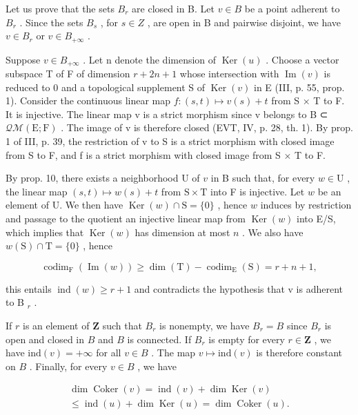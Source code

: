 Let us prove that the sets \(B_{r}\) are closed in B. Let \(v \in B\) be a point adherent to \(B_{r}\) . Since the sets \(B_{s}\) , for \(s \in Z\) , are open in B and pairwise disjoint, we have \(v \in B_{r}\) or \(v \in B_{+\infty}\) .

Suppose \(v \in B_{+\infty}\) . Let n denote the dimension of \(\operatorname{Ker}(u)\) . Choose a vector subspace T of F of dimension \(r + 2n + 1\) whose intersection with \(\operatorname{Im}(v)\) is reduced to 0 and a topological supplement S of \(\operatorname{Ker}(v)\) in E (III, p. 55, prop. 1). Consider the continuous linear map \(f: (s, t) \mapsto v(s) + t\) from S × T to F. It is injective. The linear map v is a strict morphism since v belongs to B ⊂ \(\mathcal{Q}\mathcal{M}(\mathrm{E};\mathrm{F})\) . The image of v is therefore closed (EVT, IV, p. 28, th. 1). By prop. 1 of III, p. 39, the restriction of v to S is a strict morphism with closed image from S to F, and f is a strict morphism with closed image from S × T to F.

By prop. 10, there exists a neighborhood U of \(v\) in B such that, for every \(w \in \mathrm{U}\) , the linear map \((s,t) \mapsto w(s) + t\) from \(\mathrm{S} \times \mathrm{T}\) into F is injective. Let \(w\) be an element of U. We then have \(\operatorname{Ker}(w) \cap \mathrm{S} = \{0\}\) , hence \(w\) induces by restriction and passage to the quotient an injective linear map from \(\operatorname{Ker}(w)\) into E/S, which implies that \(\operatorname{Ker}(w)\) has dimension at most \(n\) . We also have \(w(\mathrm{S}) \cap \mathrm{T} = \{0\}\) , hence

\[
\operatorname{codim} _ {\mathrm{F}} (\operatorname{Im} (w)) \geqslant \dim (\mathrm{T}) - \operatorname{codim} _ {\mathrm{E}} (\mathrm{S}) = r + n + 1,
\]

this entails \(\operatorname{ind}(w) \geqslant r + 1\) and contradicts the hypothesis that v is adherent to B \(_{r}\) .

If \(r\) is an element of \(\mathbf{Z}\) such that \(B_r\) is nonempty, we have \(B_r = B\) since \(B_r\) is open and closed in \(B\) and \(B\) is connected. If \(B_r\) is empty for every \(r \in \mathbf{Z}\) , we have \(\text{ind}(v) = +\infty\) for all \(v \in B\) . The map \(v \mapsto \text{ind}(v)\) is therefore constant on \(B\) . Finally, for every \(v \in B\) , we have

\[
\begin{array}{c} \dim \operatorname{Coker} (v) = \operatorname{ind} (v) + \dim \operatorname{Ker} (v) \\ \leqslant \operatorname{ind} (u) + \dim \operatorname{Ker} (u) = \dim \operatorname{Coker} (u). \end{array}
\]

